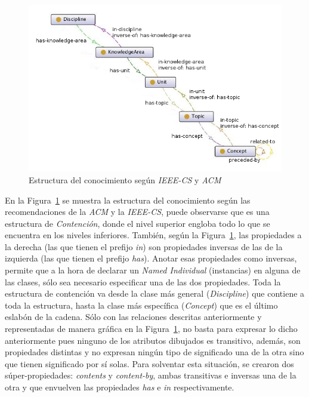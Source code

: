 \begin{itemize}
\begin{figure}
    \begin{center}
        \includegraphics[scale=0.5]{images/onto_knowledge_structure.jpg}
        \caption{Estructura del conocimiento según \textit{IEEE-CS} y \textit{ACM}}
        \label{knowledgeStructure}
    \end{center}
\end{figure}

En la Figura~\ref{knowledgeStructure} se muestra la estructura del conocimiento según las recomendaciones de la \textit{ACM} y la \textit{IEEE-CS}, puede observarse que es una estructura de \textit{Contención}, donde el nivel superior engloba todo lo que se encuentra en los niveles inferiores. También, según la Figura~\ref{knowledgeStructure}, las propiedades a la derecha (las que tienen el prefijo \textit{in}) son propiedades inversas de las de la izquierda (las que tienen el prefijo \textit{has}). Anotar esas propiedades como inversas, permite que a la hora de declarar un \textit{Named Individual} (instancias) en alguna de las clases, sólo sea necesario especificar una de las dos propiedades. Toda la estructura de contención va desde la clase más general (\textit{Discipline}) que contiene a toda la estructura, hasta la clase más específica (\textit{Concept}) que es el último eslabón de la cadena. Sólo con las relaciones descritas anteriormente y representadas de manera gráfica en la Figura~\ref{knowledgeStructure}, no basta para expresar lo dicho anteriormente pues ninguno de los atributos dibujados es transitivo, además, son propiedades distintas y no expresan ningún tipo de significado una de la otra sino que tienen significado por sí solas. Para solventar esta situación, se crearon dos súper-propiedades: \textit{contents} y \textit{content-by}, ambas transitivas e inversas una de la otra y que envuelven las propiedades \textit{has} e \textit{in} respectivamente.


\end{itemize}
